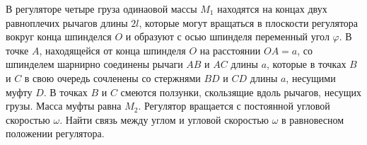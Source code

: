 В регуляторе четыре груза одинаовой массы $M_1$ находятся на концах
двух равноплечих рычагов длины $2l$, которые могут вращаться
в плоскости регулятора вокруг конца шпинделся $O$ и образуют с осью
шпинделя переменный угол $\varphi$.
В точке $A$, находящейся от конца шпинделя $O$ на расстоянии $OA = a$,
со шпинделем шарнирно соединены рычаги $AB$ и $AC$ длины $a$,
которые в точках $B$ и $C$ в свою очередь сочленены со стержнями
$BD$ и $CD$ длины $a$, несущими муфту $D$.
В точках $B$ и $C$ смеются ползунки, скользящие вдоль рычагов, несущих грузы.
Масса муфты равна $M_2$.
Регулятор вращается с постоянной угловой скоростью $\omega$.
Найти связь между углом и угловой скоростью $\omega$
в равновесном положении регулятора.
